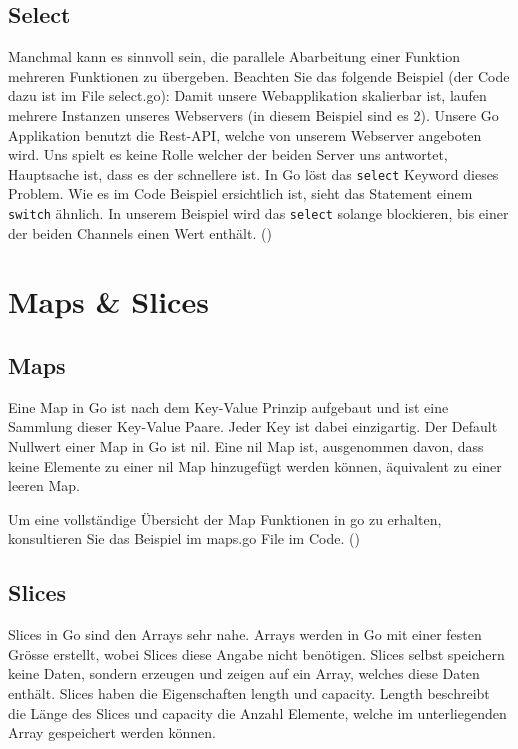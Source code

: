 \documentclass[11pt]{article}
\begin{document}
\subsection{Select}
Manchmal kann es sinnvoll sein, die parallele Abarbeitung einer Funktion mehreren Funktionen zu übergeben. Beachten Sie das folgende Beispiel (der Code dazu ist im File select.go): Damit unsere Webapplikation skalierbar ist, laufen mehrere Instanzen unseres Webservers (in diesem Beispiel sind es 2). Unsere Go Applikation benutzt die Rest-API, welche von unserem Webserver angeboten wird. Uns spielt es keine Rolle welcher der beiden Server uns antwortet, Hauptsache ist, dass es der schnellere ist. 
In Go löst das \lstinline{select} Keyword dieses Problem. Wie es im Code Beispiel ersichtlich ist, sieht das Statement einem \lstinline{switch} ähnlich. In unserem Beispiel wird das \lstinline{select} solange blockieren, bis einer der beiden Channels einen Wert enthält. (\cite{Guney2018})

\section{Maps \& Slices}
\subsection{Maps}

Eine Map in Go ist nach dem Key-Value Prinzip aufgebaut und ist eine Sammlung dieser Key-Value Paare. Jeder Key ist dabei einzigartig. 
Der Default Nullwert einer Map in Go ist nil. Eine nil Map ist, ausgenommen davon, dass keine Elemente zu einer nil Map hinzugefügt werden können, äquivalent zu einer leeren Map.

Um eine vollständige Übersicht der Map Funktionen in go zu erhalten, konsultieren Sie das Beispiel im maps.go File im Code. (\cite{Maps:online})


\subsection{Slices}

Slices in Go sind den Arrays sehr nahe. Arrays werden in Go mit einer festen Grösse erstellt, wobei Slices diese Angabe nicht benötigen. Slices selbst speichern keine Daten, sondern erzeugen und zeigen auf ein Array, welches diese Daten enthält. Slices haben die Eigenschaften length und capacity. Length beschreibt die Länge des Slices und capacity die Anzahl Elemente, welche im unterliegenden Array gespeichert werden können.
\end{document}
